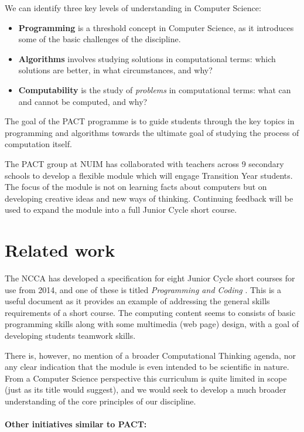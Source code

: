 \documentclass[a4paper]{article}
\begin{document}
We can identify three key levels of understanding in Computer Science:
\begin{itemize}
\item \textbf{Programming} is a threshold concept in Computer Science, as it introduces some of the basic challenges of the discipline.  
\item \textbf{Algorithms} involves studying solutions in computational terms: which solutions are better, in what circumstances, and why?
\item \textbf{Computability} is the study of \textit{problems} in 
computational terms: what can and cannot be computed, and why?
\end{itemize}

The goal of the PACT programme is to guide students through the key topics in programming and algorithms towards the ultimate goal of studying the process of computation itself.

The PACT group at NUIM has collaborated with teachers across 9 secondary schools to develop a flexible module which will engage Transition Year students.  The focus of the module is not on learning facts about computers but on developing creative ideas and new ways of thinking.  Continuing feedback will be used to expand the module into a full Junior Cycle short course. 

\section{Related work} \label{sect:relWork}

The NCCA has developed a specification for eight Junior Cycle short courses for use from 2014, and one of these is 
titled \textit{Programming and Coding} \cite{ncca-prog13}.  This is a useful document as it provides an example of addressing the general skills requirements of a short course.  The computing content seems to consists of basic programming skills along with some multimedia (web page) design, with a goal of developing students teamwork skills.  

There is, however, no mention of a broader Computational Thinking agenda, nor any clear indication that the module is even intended to be scientific in nature.  From a Computer Science perspective this curriculum is quite limited in scope (just as its title would suggest), and we would seek to develop a much broader understanding of the core principles of our discipline.

\paragraph{Other initiatives similar to PACT:}
\end{document}
